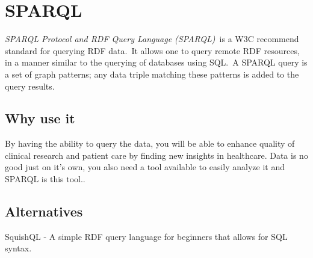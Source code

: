   \section[SPARQL Protocol and RDF Query Language (SPARQL)]{SPARQL}
  \label{sec:sparql}

  \textit{SPARQL Protocol and RDF Query Language (SPARQL)}\
  is a W3C recommend standard for querying RDF data.\
  It allows one to query remote RDF resources, in a manner similar to the querying of databases using SQL.\
  A SPARQL query is a set of graph patterns; any data triple matching these patterns is added to the query results. \citep{Jarrar_mashql:_2008}\\     

  \subsection{Why use it}

By having the ability to query the data, you will be able to enhance quality of clinical research and patient care by finding new insights in healthcare. Data is no good just on it's own, you also need a tool available to easily analyze it and SPARQL is this tool..
		
  \subsection{Alternatives}

  SquishQL - A simple RDF query language for beginners that allows for SQL syntax. \citep{_Mikhalenko_2013}\

